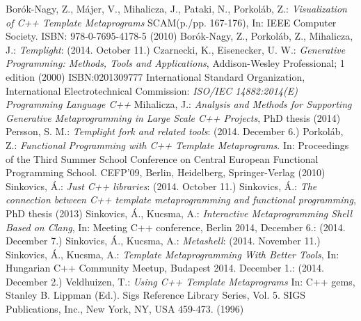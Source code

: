 
\begin{thebibliography}{99}
    Borók-Nagy, Z., Májer, V., Mihalicza, J., Pataki, N., Porkoláb, Z.:
    \textit{Visualization of C++ Template Metaprograms} SCAM(p./pp. 167-176),
    In: IEEE Computer Society. ISBN: 978-0-7695-4178-5 (2010)
    Borók-Nagy, Z., Porkoláb, Z., Mihalicza, J.:
    \textit{Templight}:
     (2014. October 11.)
    Czarnecki, K., Eisenecker, U. W.:
    \textit{Generative Programming: Methods, Tools and Applications},
    Addison-Wesley Professional; 1 edition (2000) ISBN:0201309777
    International Standard Organization, International Electrotechnical
    Commission: \textit{ISO/IEC 14882:2014(E) Programming Language C++}
    Mihalicza, J.:
    \textit{Analysis and Methods for Supporting Generative Metaprogramming in
    Large Scale C++ Projects}, PhD thesis (2014)
    Persson, S. M.:
    \textit{Templight fork and related tools}:
    (2014. December 6.)
    Porkoláb, Z.:
    \textit{Functional Programming with C++ Template Metaprograms}.
    In: Proceedings of the Third Summer School Conference on
    Central European Functional Programming School. CEFP’09, Berlin,
    Heidelberg, Springer-Verlag (2010)
    Sinkovics, Á.:
    \textit{Just C++ libraries}:
     (2014. October 11.)
    Sinkovics, Á.:
    \textit{The connection between C++ template metaprogramming and functional
    programming}, PhD thesis (2013)
    Sinkovics, Á., Kucsma, A.:
    \textit{Interactive Metaprogramming Shell Based on Clang}, In:
    Meeting C++ conference, Berlin 2014, December 6.:
    (2014. December 7.)
    Sinkovics, Á., Kucsma, A.:
    \textit{Metashell}:
     (2014. November 11.)
    Sinkovics, Á., Kucsma, A.:
    \textit{Template Metaprogramming With Better Tools}, In: Hungarian C++
    Community Meetup, Budapest 2014. December 1.:
    (2014. December 2.)
    Veldhuizen, T.:
    \textit{Using C++ Template Metaprograms} In: C++ gems, Stanley B. Lippman
    (Ed.). Sigs Reference Library Series, Vol. 5. SIGS Publications, Inc.,
    New York, NY, USA 459-473. (1996)


\end{thebibliography}

